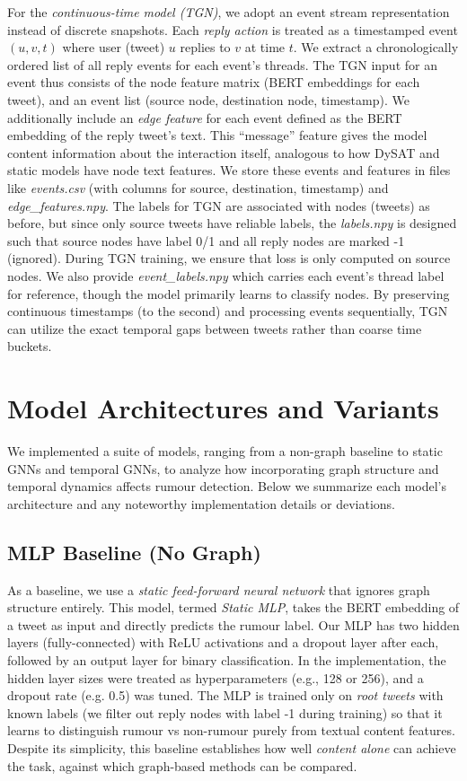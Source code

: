 \documentclass{cshonours}
\begin{document}
For the \emph{continuous-time model (TGN)}, we adopt an event stream representation instead of discrete snapshots. Each \emph{reply action} is treated as a timestamped event $(u, v, t)$ where user (tweet) $u$ replies to $v$ at time $t$. We extract a chronologically ordered list of all reply events for each event's threads. The TGN input for an event thus consists of the node feature matrix (BERT embeddings for each tweet), and an event list (source node, destination node, timestamp). We additionally include an \emph{edge feature} for each event defined as the BERT embedding of the reply tweet's text. This ``message'' feature gives the model content information about the interaction itself, analogous to how DySAT and static models have node text features. We store these events and features in files like \emph{events.csv} (with columns for source, destination, timestamp) and \emph{edge\_features.npy}. The labels for TGN are associated with nodes (tweets) as before, but since only source tweets have reliable labels, the \emph{labels.npy} is designed such that source nodes have label 0/1 and all reply nodes are marked -1 (ignored). During TGN training, we ensure that loss is only computed on source nodes. We also provide \emph{event\_labels.npy} which carries each event's thread label for reference, though the model primarily learns to classify nodes. By preserving continuous timestamps (to the second) and processing events sequentially, TGN can utilize the exact temporal gaps between tweets rather than coarse time buckets.

\section{Model Architectures and Variants}

We implemented a suite of models, ranging from a non-graph baseline to static GNNs and temporal GNNs, to analyze how incorporating graph structure and temporal dynamics affects rumour detection. Below we summarize each model's architecture and any noteworthy implementation details or deviations.

\subsection{MLP Baseline (No Graph)}

As a baseline, we use a \emph{static feed-forward neural network} that ignores graph structure entirely. This model, termed \emph{Static MLP}, takes the BERT embedding of a tweet as input and directly predicts the rumour label. Our MLP has two hidden layers (fully-connected) with ReLU activations and a dropout layer after each, followed by an output layer for binary classification. In the implementation, the hidden layer sizes were treated as hyperparameters (e.g., 128 or 256), and a dropout rate (e.g. 0.5) was tuned. The MLP is trained only on \emph{root tweets} with known labels (we filter out reply nodes with label -1 during training) so that it learns to distinguish rumour vs non-rumour purely from textual content features. Despite its simplicity, this baseline establishes how well \emph{content alone} can achieve the task, against which graph-based methods can be compared.
\end{document}
